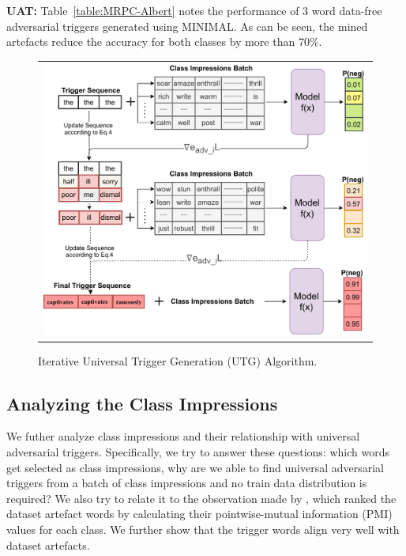 \textbf{UAT:} Table~\ref{table:MRPC-Albert} notes the performance of 3 word data-free adversarial triggers generated using MINIMAL. As can be seen, the mined artefacts reduce the accuracy for both classes by more than 70\%. 

\begin{figure}[htbp]
 \centering
 \begin{tabular}{c}
\includegraphics[width=\textwidth]{images/UAT.pdf}
 \end{tabular}

 \caption{Iterative Universal Trigger Generation (UTG) Algorithm.
 }
 \label{fig:UAT Generation Algorithm}

\end{figure}





\subsection{Analyzing the Class Impressions}
\label{sec:Analysing the Class Impressions}
We futher analyze class impressions and their relationship with universal adversarial triggers. Specifically, we try to answer these questions: which words get selected as class impressions, why are we able to find universal adversarial triggers from a batch of class impressions and no train data distribution is required? We also try to relate it to the observation made by \cite{gururangan2018annotation,poliak2018hypothesis}, which ranked the dataset artefact words by calculating their pointwise-mutual information (PMI) values for each class. We further show that the trigger words align very well with dataset artefacts.


